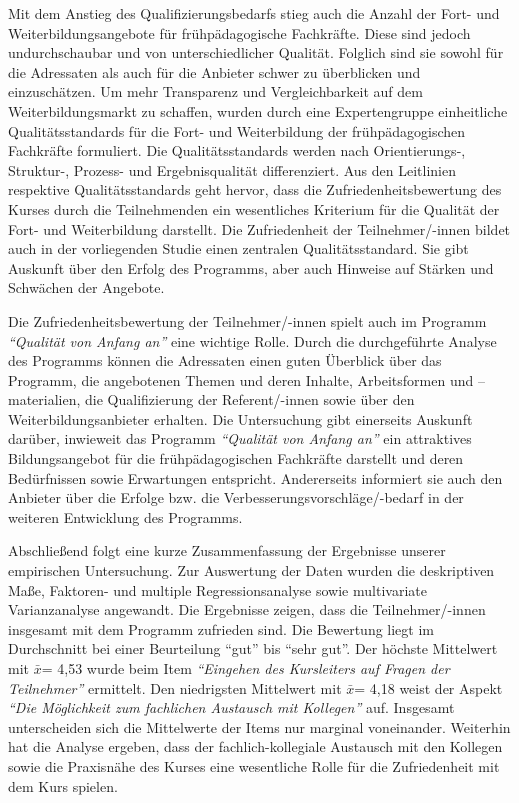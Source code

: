 \documentclass[12pt,a4paper]{article}
\begin{document}
Mit dem Anstieg des Qualifizierungsbedarfs stieg auch die Anzahl der Fort- und Weiterbildungsangebote für frühpädagogische Fachkräfte. Diese sind jedoch undurchschaubar und von unterschiedlicher Qualität. Folglich sind sie sowohl für die Adressaten als auch für die Anbieter schwer zu über\-bli\-cken und einzuschätzen. Um mehr Transparenz und Vergleichbarkeit auf dem Weiterbildungsmarkt zu schaffen, wurden durch eine Expertengruppe einheitliche Qualitätsstandards für die Fort- und Weiterbildung der früh\-pä\-da\-gogi\-schen Fachkräfte formuliert. Die Qualitätsstandards werden nach Orientierungs-, Struktur-, Prozess- und Ergebnisqualität differenziert. Aus den Leitlinien respektive Qualitäts\-stan\-dards geht hervor, dass die Zufriedenheitsbewertung des Kurses durch die Teilnehmenden ein wesentliches Kriterium für die Qualität der Fort- und Weiterbildung darstellt. Die Zufriedenheit der Teilnehmer/-innen bildet auch in der vorliegenden Studie einen zentralen Qualitätsstandard. Sie gibt Auskunft über den Erfolg des Programms, aber auch Hinweise auf Stärken und Schwächen der Angebote.

Die Zufriedenheitsbewertung der Teilnehmer/-innen spielt auch im Programm \textit{"`Qualität von Anfang an"' }eine wichtige Rolle. Durch die durchgeführte Analyse des Programms können die Adressaten einen guten Über\-blick über das Programm, die angebotenen Themen und deren Inhalte, Arbeitsformen und –materialien, die Qualifizierung der Referent/-innen sowie über den Weiterbildungsanbieter erhalten. Die Untersuchung gibt einerseits Auskunft darüber, inwieweit das Programm \textit{"`Qualität von Anfang an"'} ein attraktives Bildungsangebot für die frühpädagogischen Fachkräfte darstellt und deren Bedürfnissen sowie Erwartungen entspricht. Andererseits informiert sie auch den Anbieter über die Erfolge bzw. die Verbesserungsvorschläge/-bedarf in der weiteren Entwicklung des Programms.

Abschließend folgt eine kurze Zusammenfassung der Ergebnisse unserer empirischen Untersuchung. Zur Auswertung der Daten wurden die deskriptiven Maße, Faktoren- und multiple Regressionsanalyse sowie multivariate Varianzanalyse angewandt. Die Ergebnisse zeigen, dass die Teilnehmer/-innen insgesamt mit dem Programm zufrieden sind. Die Bewertung liegt im Durchschnitt bei einer Beurteilung "`gut"' bis "`sehr gut"'. Der höchste Mittelwert mit $\bar x$= 4,53 wurde beim Item\textit{ "`Eingehen des Kursleiters auf Fragen der Teilnehmer"' }ermittelt. Den niedrigsten Mittelwert mit $\bar x$= 4,18 weist der Aspekt \textit{"`Die Möglichkeit zum fachlichen Austausch mit Kollegen"'} auf. Insgesamt unterscheiden sich die Mittelwerte der Items nur marginal voneinander. 
Weiterhin hat die Analyse ergeben, dass der fachlich-kollegiale Austausch mit den Kollegen sowie die Praxisnähe des Kurses eine wesentliche Rolle für die Zufriedenheit mit dem Kurs spielen. 
\end{document}
